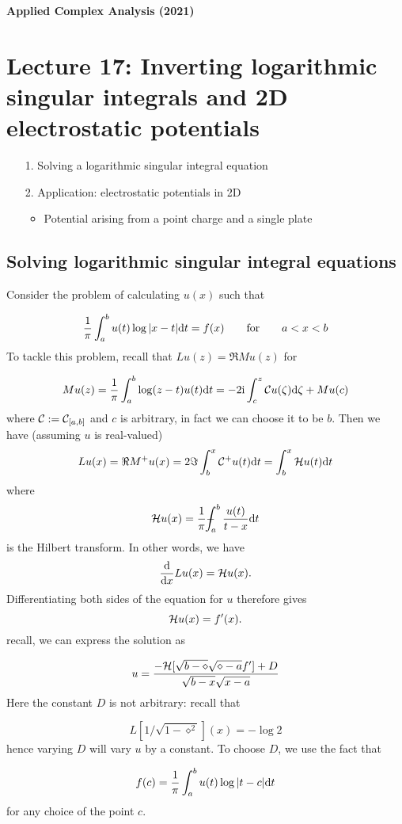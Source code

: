 \documentclass[12pt,landscape]{article}
\def\qqfor{\qquad\hbox{for}\qquad}
\def\D{ {\rm d} }
\def\I{ {\rm i} }
\def\CC{ {\cal C} }
\def\HH{ {\cal H} }
\def\Xint#1{ \mathchoice
   {\XXint\displaystyle\textstyle{#1} }%
   {\XXint\textstyle\scriptstyle{#1} }%
   {\XXint\scriptstyle\scriptscriptstyle{#1} }%
   {\XXint\scriptscriptstyle\scriptscriptstyle{#1} }%
   \!\int}
\def\XXint#1#2#3{ {\setbox0=\hbox{$#1{#2#3}{\int}$}
     \vcenter{\hbox{$#2#3$}}\kern-.5\wd0} }
\def\dashint{\Xint-}
\def\dx{\D x}
\def\dt{\D t}
\begin{document}
{\LARGE
\sf
\textbf{Applied Complex Analysis (2021)}

\section{Lecture 17: Inverting logarithmic singular integrals and 2D electrostatic potentials}
\begin{itemize}
\item[1. ] Solving a logarithmic singular integral equation


\item[2. ] Application: electrostatic potentials in 2D

\begin{itemize}
\item Potential arising from a point charge and a single plate

\end{itemize}
\end{itemize}
\subsection{Solving logarithmic singular integral equations}
Consider the problem of calculating $u(x)$ such that

\[
{1 \over \pi} \int_a^b u(t) \log | x-t| \dt = f(x) \qqfor a < x < b
\]
To tackle this problem, recall that $L u(z) = \Re M u(z)$ for

\[
M u(z) = {1 \over \pi} \int_a^b \log(z-t) u(t) \D t =  -2 \I \int_c^z \CC u(\zeta) \D \zeta + M u(c)
\]
where  $\CC := \CC_{[a, b]}$ and  $c$ is arbitrary, in fact we can choose it to be $b$. Then we have (assuming $u$ is real-valued)
\[
L u(x) =  \Re M^+ u(x) = 2\Im \int_b^x \CC^+ u(t) \D t =  \int_b^x \HH u(t) \D t
\]
where
\[
\HH u(x) = {1 \over \pi} \dashint_a^b {u(t) \over t -x } \D t
\]
is the Hilbert transform. In other words, we have
\[
{\D \over \dx} L u(x) = \HH u(x).
\]
Differentiating both sides of the equation for $u$ therefore gives
\[
\HH u(x) = f'(x).
\]
recall, we can express the solution as

\[
    u = {-\HH[\sqrt{b-\diamond}\sqrt{\diamond-a} f'] + D \over \sqrt{b-x}\sqrt{x-a}}
\]
Here the constant $D$ is not arbitrary: recall that

\[
L[1/\sqrt{1-\diamond^2}](x) = - \log 2
\]
hence varying $D$ will vary $u$ by a constant. To choose $D$,  we use the fact that

\[
f(c) = {1 \over \pi} \int_a^b u(t) \log |t-c| \dt
\]
for any choice of the point  $c$.
\newpage

}
\end{document}
